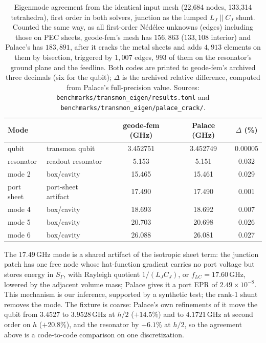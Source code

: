 \documentclass{anvil-paper}
\begin{document}
\begin{table}[htbp]
  \centering
  \caption{Eigenmode agreement from the identical input mesh (22{,}684
  nodes, 133{,}314 tetrahedra), first order in both solvers, junction as
  the lumped $L_J \parallel C_J$ shunt. Counted the same way, as all
  first-order N\'ed\'elec unknowns (edges) including those on PEC sheets,
  geode-fem's mesh has $156{,}863$ ($133{,}108$ interior) and Palace's has
  $183{,}891$, after it cracks the metal sheets and adds $4{,}913$ elements
  on them by bisection, triggered by $1{,}007$ edges, $993$ of them on
  the resonator's ground plane and the feedline. Both
  codes are printed to geode-fem's archived three decimals (six for the
  qubit); $\Delta$ is the archived relative difference, computed from
  Palace's full-precision value. Sources:
  \texttt{benchmarks/transmon\_eigen/results.toml} and
  \texttt{benchmarks/transmon\_eigen/palace\_crack/}.}
  \label{tab:agreement}
  \footnotesize
  \begin{tabular}{@{}llccc@{}}
    \toprule
    Mode & & geode-fem (GHz) & Palace (GHz) & $\Delta$ (\%) \\
    \midrule
    qubit & transmon qubit & 3.452751 & 3.452749 & 0.00005 \\
    resonator & readout resonator & 5.153 & 5.151 & 0.032 \\
    mode 2 & box/cavity & 15.465 & 15.461 & 0.029 \\
    port sheet & port-sheet artifact & 17.490 & 17.490 & 0.001 \\
    mode 4 & box/cavity & 18.693 & 18.692 & 0.007 \\
    mode 5 & box/cavity & 20.703 & 20.698 & 0.026 \\
    mode 6 & box/cavity & 26.088 & 26.081 & 0.027 \\
    \bottomrule
  \end{tabular}
\end{table}

The $17.49$\,GHz mode is a shared artifact of the isotropic sheet term:
the junction patch has one free node whose hat-function gradient carries no
port voltage but stores energy in $S_\Gamma$, with Rayleigh quotient
$1/(L_JC_J)$, or $f_{LC} = 17.60$\,GHz, lowered by the adjacent volume
mass; Palace gives it a port EPR of $2.49\times10^{-8}$. This mechanism is
our inference, supported by a synthetic test; the rank-1 shunt removes the
mode. The fixture is coarse: Palace's own refinements of it move the qubit from
$3.4527$ to $3.9528$\,GHz at $h/2$ ($+14.5\%$) and to $4.1721$\,GHz at
second order on $h$ ($+20.8\%$), and the resonator by $+6.1\%$ at $h/2$, so
the agreement above is a code-to-code comparison on one discretization.
\end{document}
